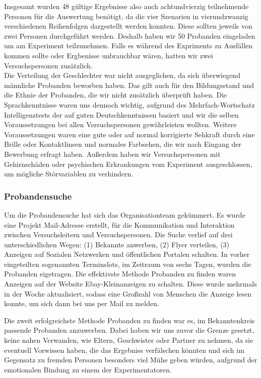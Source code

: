 \documentclass{Bericht}
\begin{document}
Insgesamt wurden 48 gültige Ergebnisse also auch achtundvierzig teilnehmende Personen für die Auswertung benötigt, da die vier Szenarien in vierundzwanzig verschiedenen Reihenfolgen dargestellt werden konnten. Diese sollten jeweils von zwei Personen durchgeführt werden. Deshalb haben wir 50 Probanden eingeladen um am Experiment teilzunehmen. Falls es während des Expriments zu Ausfällen kommen sollte oder Ergbenisse unbrauchbar wären, hatten wir zwei Versuchspersonen zusätzlich. \\

Die Verteilung der Geschlechter war nicht ausgeglichen, da sich überwiegend männliche Probanden beworben haben. Das gilt auch für den Bildungsstand und die Ethnie der Probanden, die wir nicht zusätzlich überprüft haben. Die Sprachkenntnisse waren uns dennoch wichtig, aufgrund des Mehrfach-Wortschatz Intelligenztests der auf guten Deutschkenntnissen basiert und wir die selben Voraussetzungen bei allen Versuchspersonen gewährleisten wollten. Weitere Voraussetzungen waren eine gute oder auf normal korrigierte Sehkraft durch eine Brille oder Kontaktlinsen und normales Farbsehen, die wir nach Eingang der Bewerbung erfragt haben. Außerdem haben wir Versuchspersonen mit Gehirnschäden oder psychischen Erkrankungen vom Experiment ausgeschlossen, um mögliche Störvariablen zu verhindern. 

\subsubsection{Probandensuche} 

Um die Probandensuche hat sich das Organisationteam gekümmert. Es wurde eine Projekt Mail-Adresse erstellt, für die Kommunikation und Interaktion zwischen Versuchsleitern und Versuchspersonen. Die Suche verlief auf drei unterschiedlichen Wegen: (1) Bekannte anwerben, (2) Flyer verteilen, (3) Anzeigen auf Sozialen Netzwerken und öffentlichen Portalen schalten. In vorher eingeteilten sogenannten \glqq Terminslots\grqq{}, im Zeitraum von sechs Tagen, wurden die Probanden eigetragen. Die effektivste Methode Probanden zu finden waren Anzeigen auf der Website \glqq Ebay-Kleinanzeigen\grqq{} zu schalten. Diese wurde mehrmals in der Woche aktualisiert, sodass eine Großzahl von Menschen die Anzeige lesen konnte, um sich dann bei uns per Mail zu melden.

Die zweit erfolgreichste Methode Probanden zu finden war es, im Bekanntenkreis passende Probanden anzuwerben. Dabei haben wir uns zuvor die Grenze gesetzt, keine nahen Verwanden, wie Eltern, Geschwister oder Partner zu nehmen, da sie eventuell Vorwissen haben, die das Ergebniss verfälschen könnten und sich im Gegensatz zu fremden Personen besonders viel Mühe geben würden, aufgrund der emotionalen Bindung zu einem der Experimentatoren. 
\end{document}
